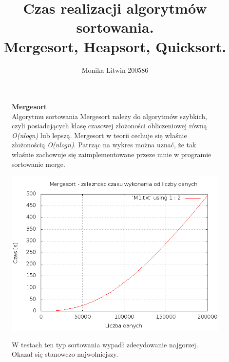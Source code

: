 \documentclass[a4paper,11pt]{report}
\title{Czas realizacji algorytmów sortowania.
\\Mergesort, Heapsort, Quicksort.}
\author{Monika Litwin 200586}
\begin{document}
\maketitle

\begin{figure}
  \begin{center}
  \textbf{Mergesort}
\\
Algorytmu sortowania Mergesort należy do algorytmów szybkich, czyli posiadających klasę czasowej złożoności obliczeniowej równą \emph{O(nlogn)} lub lepszą. Mergesort w teorii cechuje się właśnie złożonością \emph{O(nlogn)}. Patrząc na wykres można uznać, że tak właśnie zachowuje się zaimplementowane przeze mnie w programie sortowanie merge. 

    \includegraphics[scale=0.5]{./merge1.png}
    \label{fig:}
  \end{center}
\end{figure}

\begin{figure}
  \begin{center}
  W testach ten typ sortowania wypadł zdecydowanie najgorzej. Okazał się stanowczo najwolniejszy.
    \label{fig:}
  \end{center}
\end{figure}
\end{document}
